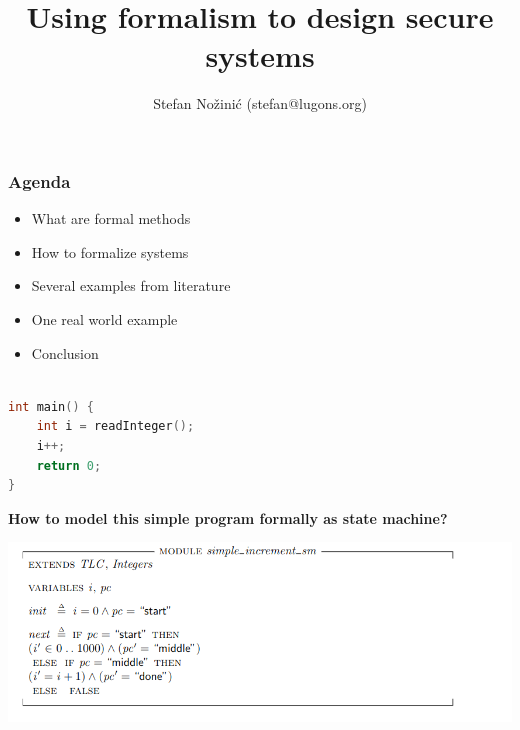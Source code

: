 \documentclass{beamer}
\begin{document}
\title{Using formalism to design secure systems}
\author{Stefan Nožinić (stefan@lugons.org)}

\frame{
\titlepage
}

\begin{frame}
    \frametitle{Agenda}
    \begin{itemize}
        \item What are formal methods
        \item How to formalize systems 
        \item Several examples from literature 
        \item One real world example
        \item Conclusion
    \end{itemize}

\end{frame}

\begin{frame}[fragile]
	\begin{lstlisting}[language=C++]

int main() {
    int i = readInteger();
    i++;
    return 0;
}

	\end{lstlisting}
	
\end{frame}

\begin{frame}
    \begin{center}
        \LARGE{\textbf{How to model this simple program formally as state machine?}}
    \end{center}

\end{frame}


\begin{frame}[fragile]
    \includegraphics[width=\textwidth]{./sm_increment.png}
\end{frame}
\end{document}

